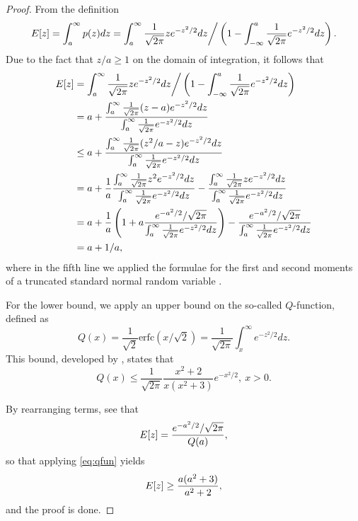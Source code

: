 \documentclass[12pt]{article}
\newcommand{\Exp}[1]{{\rm{E}}[ #1 ]}
\begin{document}
\begin{proof}
From the definition 
\begin{equation*}
    \Exp{z} = \int_a^\infty p(z) dz = \int_a^\infty \frac{1}{\sqrt{2 \pi}} z e^{-z^2/2}dz \bigg/ \left( 1 - \int_{-\infty}^a \frac{1}{\sqrt{2 \pi}} e^{-z^2/2}dz\right).
\end{equation*}
Due to the fact that $z/a \geq 1$ on the domain of integration, it follows that
\begin{equation*}
\begin{aligned}
    \Exp{z} &= \int_a^\infty \frac{1}{\sqrt{2 \pi}} z e^{-z^2/2}dz \bigg/ \left( 1 - \int_{-\infty}^a \frac{1}{\sqrt{2 \pi}} e^{-z^2/2}dz\right) \\
    &= a + \frac{\int_a^\infty \frac{1}{\sqrt{2 \pi}} (z-a) e^{-z^2/2}dz}{\int_{a}^\infty \frac{1}{\sqrt{2 \pi}} e^{-z^2/2}dz} \\
    &\leq a+ \frac{\int_a^\infty \frac{1}{\sqrt{2 \pi}} (z^2/a-z) e^{-z^2/2}dz}{\int_{a}^\infty \frac{1}{\sqrt{2 \pi}} e^{-z^2/2}dz} \\
    &= a + \frac{1}{a}\frac{\int_a^\infty \frac{1}{\sqrt{2 \pi}} z^2 e^{-z^2/2}dz}{\int_{a}^\infty \frac{1}{\sqrt{2 \pi}} e^{-z^2/2}dz} - \frac{\int_a^\infty \frac{1}{\sqrt{2 \pi}} z e^{-z^2/2}dz}{\int_{a}^\infty \frac{1}{\sqrt{2 \pi}} e^{-z^2/2}dz} \\
    &= a + \frac{1}{a}\left(1 + a \frac{e^{-a^2/2} / \sqrt{2\pi}}{\int_{a}^\infty \frac{1}{\sqrt{2 \pi}} e^{-z^2/2}dz}\right) - \frac{e^{-a^2/2} / \sqrt{2\pi}}{\int_{a}^\infty \frac{1}{\sqrt{2 \pi}} e^{-z^2/2}dz}\\
    &= a + 1/a,
\end{aligned}
\end{equation*}
where in the fifth line we applied the formulae for the first and second moments of a truncated standard normal random variable \citep{johnson_continuous_1994}.

For the lower bound, we apply an upper bound on the so-called $Q$-function, defined as
\begin{equation*}
    Q(x) = \frac{1}{\sqrt{2}} \mathrm{erfc}(x / \sqrt{2}) = \frac{1}{\sqrt{2\pi}} \int_{x}^\infty e^{-z^2/2} dz.
\end{equation*}
This bound, developed by \cite{peric_class_2019}, states that
\begin{equation}\label{eq:qfun}
    Q(x) \leq \frac{1}{\sqrt{2\pi}} \frac{x^2+2}{x(x^2+3)} e^{-x^2/2},~x >0.
\end{equation}

By rearranging terms, see that
\begin{equation*}
    \Exp{z} = \frac{e^{-a^2/2} / \sqrt{2\pi}}{Q(a)},
\end{equation*}
so that applying \eqref{eq:qfun} yields
\begin{equation*}
    \Exp{z} \geq \frac{a(a^2+3)}{a^2+2},
\end{equation*}
and the proof is done.
\end{proof}
\end{document}
